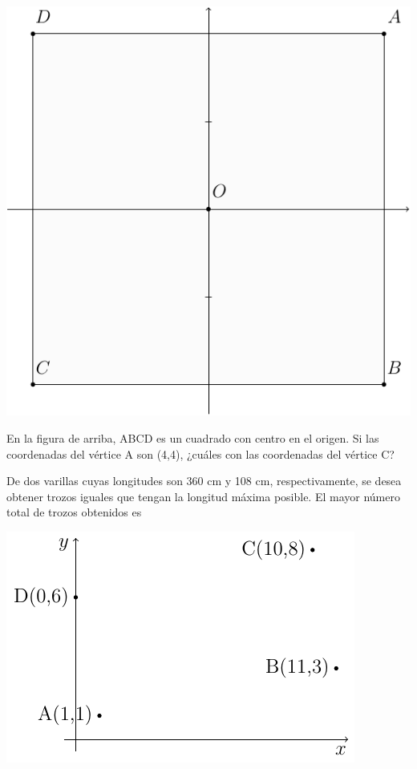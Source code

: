 \documentclass[letterpaper,10pt]{examdesign}
\begin{document}
\begin{multiplechoice}[rearrange=no,keycolumns=4,examcolumns=2]
\begin{block}
\hspace*{.5in}\includegraphics[scale=.75]{Images/cuadrado.pdf}
\begin{question}
En la figura de arriba, ABCD es un cuadrado con centro en el origen. Si las coordenadas del vértice A son (4,4), ¿cuáles con las coordenadas del vértice C?
\end{question}
\end{block}
\begin{question}
De dos varillas cuyas longitudes son 360 cm y 108 cm, respectivamente, se desea obtener trozos iguales que tengan la longitud máxima posible. El mayor número total de trozos obtenidos es
   
\end{question}
\begin{block}
\hspace*{1cm}\includegraphics[scale=.8]{Images/puntos.pdf} 

\end{block}
\end{multiplechoice}
\end{document}
